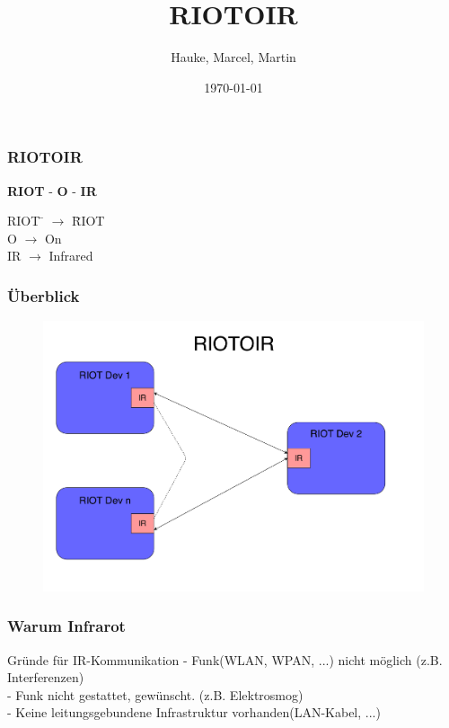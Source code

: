 \documentclass{beamer}
\title{RIOTOIR}
\author{Hauke, Marcel, Martin}
\date{\today}
\begin{document}
\beamertemplatenavigationsymbolsempty
\unitlength 5mm

\maketitle

\begin{frame} %
  \frametitle{ RIOTOIR } %
  \begin{block}{\textbf{RIOT} - \textbf{O} - \textbf{IR}}
  	\begin{tabbing}
    	RIOT \= $\rightarrow$ \= RIOT\\
    	\break
    	O  	 \> $\rightarrow$ \> On\\
			\break    	
    	IR   \> $\rightarrow$ \> Infrared\\
		\end{tabbing} 
  \end{block}
\end{frame}

\begin{frame} %
  \frametitle{ Überblick } %
  \begin{figure}
  	\includegraphics[scale=0.35]{Medien/RIOTOIR-Overview.pdf}
  \end{figure}
\end{frame}


\begin{frame} %
  \frametitle{ Warum Infrarot } %
  \begin{block}{Gründe für IR-Kommunikation}
  	- Funk(WLAN, WPAN, ...) nicht möglich (z.B. Interferenzen)\\
  	\break
  	- Funk nicht gestattet, gewünscht. (z.B. Elektrosmog)\\
  	\break
  	- Keine leitungsgebundene Infrastruktur vorhanden(LAN-Kabel, ...)\\ 	
  \end{block}
\end{frame}
\end{document}
